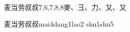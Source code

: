 \begin{entry}{麦当劳叔叔}{7,6,7,8,8}{⿆、⼹、⼒、⼜、⼜}
  \begin{phonetics}{麦当劳叔叔}{mai4dang1lao2 shu1shu5}
  \end{phonetics}
\end{entry}
